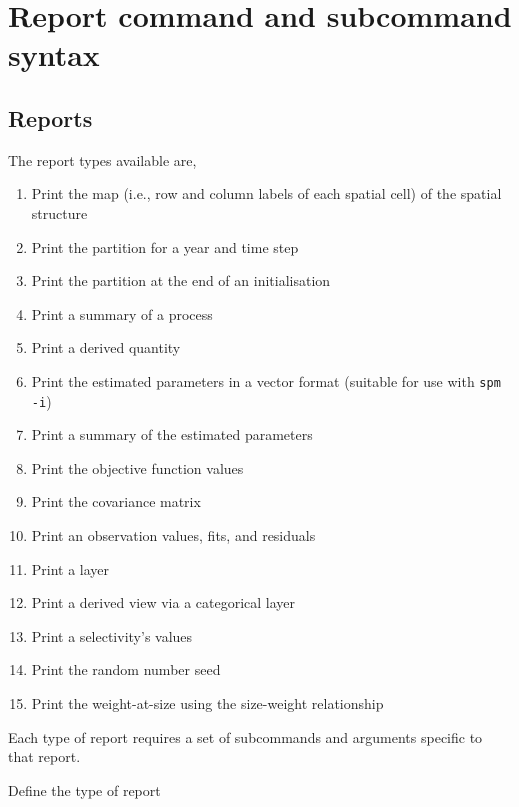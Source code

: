 \section{Report command and subcommand syntax\label{sec:report-syntax}}

\subsection{Reports}

The report types available are,

\begin{enumerate}
  \item Print the map (i.e., row and column labels of each spatial cell) of the spatial structure
  \item Print the partition for a year and time step
  \item Print the partition at the end of an initialisation
  \item Print a summary of a process
  \item Print a derived quantity
  \item Print the estimated parameters in a vector format (suitable for use with \texttt{spm -i})
  \item Print a summary of the estimated parameters
  \item Print the objective function values
  \item Print the covariance matrix
  \item Print an observation values, fits, and residuals
  \item Print a layer
  \item Print a derived view via a categorical layer
  \item Print a selectivity's values
  \item Print the random number seed
  \item Print the weight-at-size using the size-weight relationship
\end{enumerate}

Each type of report requires a set of subcommands and arguments specific to that report.


 {Define the type of report}

\subsubsection[Print the map (i.e., row and column labels of each spatial cell) of the spatial structure]{}

